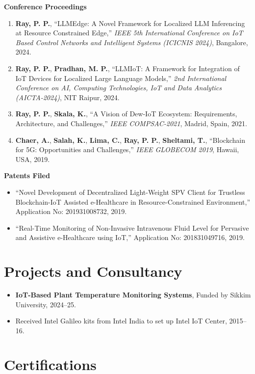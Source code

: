 \documentclass[10pt,a4paper]{article}
\begin{document}
	\textbf{Conference Proceedings}
	\begin{enumerate}[leftmargin=0.2in]
		\item \textbf{Ray, P. P.}, “LLMEdge: A Novel Framework for Localized LLM Inferencing at Resource Constrained Edge,” \textit{IEEE 5th International Conference on IoT Based Control Networks and Intelligent Systems (ICICNIS 2024)}, Bangalore, 2024.
		\item \textbf{Ray, P. P.}, \textbf{Pradhan, M. P.}, “LLMIoT: A Framework for Integration of IoT Devices for Localized Large Language Models,” \textit{2nd International Conference on AI, Computing Technologies, IoT and Data Analytics (AICTA-2024)}, NIT Raipur, 2024.
		\item \textbf{Ray, P. P.}, \textbf{Skala, K.}, “A Vision of Dew-IoT Ecosystem: Requirements, Architecture, and Challenges,” \textit{IEEE COMPSAC-2021}, Madrid, Spain, 2021.
		\item \textbf{Chaer, A.}, \textbf{Salah, K.}, \textbf{Lima, C.}, \textbf{Ray, P. P.}, \textbf{Sheltami, T.}, “Blockchain for 5G: Opportunities and Challenges,” \textit{IEEE GLOBECOM 2019}, Hawaii, USA, 2019.
	\end{enumerate}
	
	\textbf{Patents Filed}
	\begin{itemize}[leftmargin=0.15in]
		\item “Novel Development of Decentralized Light-Weight SPV Client for Trustless Blockchain-IoT Assisted e-Healthcare in Resource-Constrained Environment,” Application No: 201931008732, 2019.
		\item “Real-Time Monitoring of Non-Invasive Intravenous Fluid Level for Pervasive and Assistive e-Healthcare using IoT,” Application No: 201831049716, 2019.
	\end{itemize}
	
	\section*{Projects and Consultancy}
	
	\begin{itemize}[leftmargin=0.15in]
		\item \textbf{IoT-Based Plant Temperature Monitoring Systems}, Funded by Sikkim University, 2024--25.
		\item Received Intel Galileo kits from Intel India to set up Intel IoT Center, 2015--16.
	\end{itemize}
	
	\section*{Certifications}
	
\end{document}
